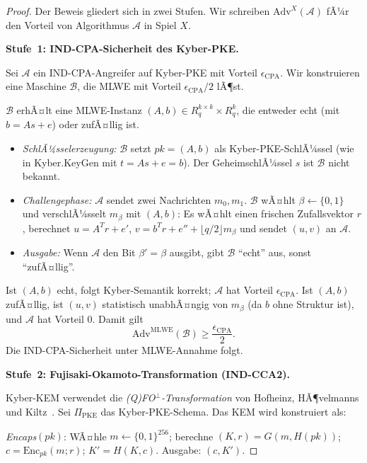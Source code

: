 ﻿\documentclass[a4paper,12pt]{article}
\theoremstyle{definition}
\begin{document}
\begin{proof}
Der Beweis gliedert sich in zwei Stufen. Wir schreiben $\mathrm{Adv}^X(\mathcal{A})$
fÃ¼r den Vorteil von Algorithmus $\mathcal{A}$ in Spiel $X$.

\textbf{Stufe~1: IND-CPA-Sicherheit des Kyber-PKE.}

Sei $\mathcal{A}$ ein IND-CPA-Angreifer auf Kyber-PKE mit Vorteil $\epsilon_\mathrm{CPA}$.
Wir konstruieren eine Maschine $\mathcal{B}$, die MLWE mit Vorteil
$\epsilon_\mathrm{CPA}/2$ lÃ¶st.

$\mathcal{B}$ erhÃ¤lt eine MLWE-Instanz $(A, b) \in R_q^{k \times k} \times R_q^k$,
die entweder echt (mit $b = As + e$) oder zufÃ¤llig ist.

\begin{itemize}
\item[(a)] \emph{SchlÃ¼sselerzeugung:} $\mathcal{B}$ setzt $pk = (A, b)$ als
  Kyber-PKE-SchlÃ¼ssel (wie in Kyber.KeyGen mit $t = As + e = b$).
  Der GeheimschlÃ¼ssel $s$ ist $\mathcal{B}$ nicht bekannt.

\item[(b)] \emph{Challengephase:} $\mathcal{A}$ sendet zwei Nachrichten $m_0, m_1$.
  $\mathcal{B}$ wÃ¤hlt $\beta \leftarrow \{0,1\}$ und verschlÃ¼sselt $m_\beta$ mit $(A, b)$:
  Es wÃ¤hlt einen frischen Zufallsvektor $r$, berechnet
  $u = A^T r + e'$, $v = b^T r + e'' + \lfloor q/2 \rfloor m_\beta$
  und sendet $(u, v)$ an $\mathcal{A}$.

\item[(c)] \emph{Ausgabe:} Wenn $\mathcal{A}$ den Bit $\beta' = \beta$ ausgibt,
  gibt $\mathcal{B}$ ``echt'' aus, sonst ``zufÃ¤llig''.
\end{itemize}

Ist $(A, b)$ echt, folgt Kyber-Semantik korrekt; $\mathcal{A}$ hat Vorteil
$\epsilon_\mathrm{CPA}$. Ist $(A, b)$ zufÃ¤llig, ist $(u, v)$ statistisch unabhÃ¤ngig
von $m_\beta$ (da $b$ ohne Struktur ist), und $\mathcal{A}$ hat Vorteil $0$.
Damit gilt
\[
  \mathrm{Adv}^\mathrm{MLWE}(\mathcal{B}) \geq \frac{\epsilon_\mathrm{CPA}}{2}.
\]
Die IND-CPA-Sicherheit unter MLWE-Annahme folgt.

\textbf{Stufe~2: Fujisaki-Okamoto-Transformation (IND-CCA2).}

Kyber-KEM verwendet die \emph{(Q)FO$^\bot$-Transformation} von Hofheinz,
HÃ¶velmanns und Kiltz~\cite{FO99}. Sei $\Pi_\mathrm{PKE}$ das Kyber-PKE-Schema.
Das KEM wird konstruiert als:

\emph{Encaps}$(pk)$: WÃ¤hle $m \leftarrow \{0,1\}^{256}$; berechne
$(K, r) = G(m, H(pk))$; $c = \mathrm{Enc}_{pk}(m; r)$; $K' = H(K, c)$.
Ausgabe: $(c, K')$.


\end{proof}
\end{document}
